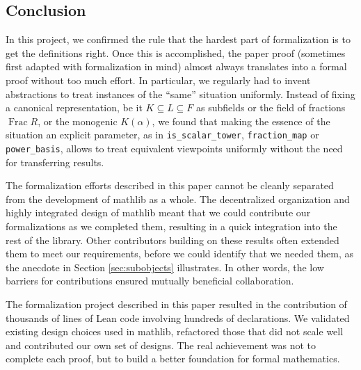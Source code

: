 \documentclass[a4paper,USenglish,cleveref, autoref, thm-restate]{lipics-v2021}
\newcommand{\lean}[1]{\texttt{#1}\xspace} %
\newcommand{\mathlib}{\textsf{mathlib}\xspace}
\DeclareMathOperator{\Frac}{Frac}
\begin{document}
\subsection{Conclusion}

In this project, we confirmed the rule that the hardest part of formalization is to get the definitions right.
Once this is accomplished, the paper proof (sometimes first adapted with formalization in mind) almost always translates into a formal proof without too much effort.
In particular, we regularly had to invent abstractions to treat instances of the ``same'' situation uniformly.
Instead of fixing a canonical representation, be it $K \subseteq L \subseteq F$ as subfields or the field of fractions $\Frac R$, or the monogenic $K(\alpha)$, we found that making the essence of the situation an explicit parameter, as in \lean{is\_scalar\_tower}, \lean{fraction\_map} or \lean{power\_basis},
allows to treat equivalent viewpoints uniformly without the need for transferring results.

The formalization efforts described in this paper cannot be cleanly separated from the development of \mathlib as a whole.
The decentralized organization and highly integrated design of \mathlib meant that we could contribute our formalizations as we completed them, resulting in a quick integration into the rest of the library.
Other contributors building on these results often extended them to meet our requirements,
before we could identify that we needed them, as the anecdote in Section \ref{sec:subobjects} illustrates.
In other words, the low barriers for contributions ensured mutually beneficial collaboration.

The formalization project described in this paper resulted in the contribution of thousands of lines of Lean code involving hundreds of declarations.
We validated existing design choices used in \mathlib, refactored those that did not scale well
and contributed our own set of designs.
The real achievement was not to complete each proof,
but to build a better foundation for formal mathematics.



\end{document}

